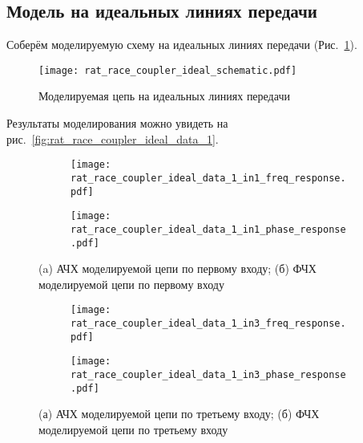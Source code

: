 \subsection{Модель на идеальных линиях передачи}

Соберём моделируемую схему на идеальных линиях передачи (Рис.~\ref{fig:rat_race_coupler_ideal_schematic}).

\begin{figure}[!ht]
    \centering
    \texttt{[image: rat\_race\_coupler\_ideal\_schematic.pdf]}
    \caption{Моделируемая цепь на идеальных линиях передачи}%
    \label{fig:rat_race_coupler_ideal_schematic}
\end{figure}

Результаты моделирования можно увидеть на рис.~\ref{fig:rat_race_coupler_ideal_data_1}.

\begin{figure}[!ht]
    \centering
    \begin{subfigure}[b]{0.40\textwidth}
        \centering
        \texttt{[image: rat\_race\_coupler\_ideal\_data\_1\_in1\_freq\_response.pdf]}
        \caption{}%
    \label{fig:rat_race_coupler_ideal_data_1_in1_freq_response}
    \end{subfigure}
    \hfill
    \begin{subfigure}[b]{0.40\textwidth}
        \centering
        \texttt{[image: rat\_race\_coupler\_ideal\_data\_1\_in1\_phase\_response.pdf]}
        \caption{}%
    \label{fig:rat_race_coupler_ideal_data_1_in1_phase_response}
    \end{subfigure}
    \caption{%
        (a) АЧХ моделируемой цепи по первому входу;
        (б) ФЧХ моделируемой цепи по первому входу
    }%
    \label{fig:rat_race_coupler_ideal_data_1_in1}
\end{figure}

\begin{figure}[!ht]
    \begin{subfigure}[b]{0.40\textwidth}
        \centering
        \texttt{[image: rat\_race\_coupler\_ideal\_data\_1\_in3\_freq\_response.pdf]}
        \caption{}%
    \label{fig:rat_race_coupler_ideal_data_1_in3_freq_response}
    \end{subfigure}
    \hfill
    \begin{subfigure}[b]{0.40\textwidth}
        \centering
        \texttt{[image: rat\_race\_coupler\_ideal\_data\_1\_in3\_phase\_response.pdf]}
        \caption{}%
    \label{fig:rat_race_coupler_ideal_data_1_in3_phase_response}
    \end{subfigure}
    \caption{%
        (а) АЧХ моделируемой цепи по третьему входу;
        (б) ФЧХ моделируемой цепи по третьему входу
    }%
    \label{fig:rat_race_coupler_ideal_data_1_in3}
\end{figure}

